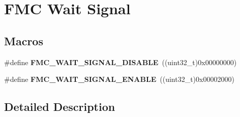 \hypertarget{group___f_m_c___wait___signal}{}\section{F\+MC Wait Signal}
\label{group___f_m_c___wait___signal}
\subsection*{Macros}
\begin{DoxyCompactItemize}
\item 
\#define {\bfseries F\+M\+C\+\_\+\+W\+A\+I\+T\+\_\+\+S\+I\+G\+N\+A\+L\+\_\+\+D\+I\+S\+A\+B\+LE}~((uint32\+\_\+t)0x00000000)\hypertarget{group___f_m_c___wait___signal_ga31b172a3d02efb7051cbdf65c0534ffb}{}\label{group___f_m_c___wait___signal_ga31b172a3d02efb7051cbdf65c0534ffb}

\item 
\#define {\bfseries F\+M\+C\+\_\+\+W\+A\+I\+T\+\_\+\+S\+I\+G\+N\+A\+L\+\_\+\+E\+N\+A\+B\+LE}~((uint32\+\_\+t)0x00002000)\hypertarget{group___f_m_c___wait___signal_ga36e1d48524ff618121a8ef7781d526dc}{}\label{group___f_m_c___wait___signal_ga36e1d48524ff618121a8ef7781d526dc}

\end{DoxyCompactItemize}


\subsection{Detailed Description}
